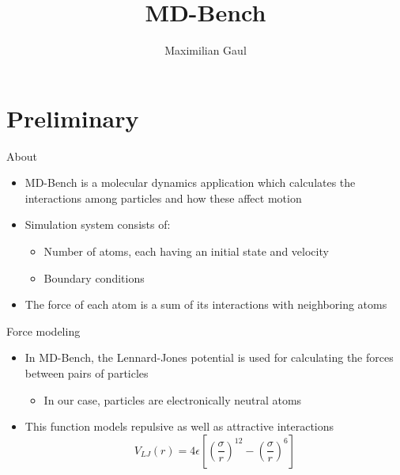 \documentclass[12pt,xcolor={rgb},t]{beamer}
\begin{document}
\title{MD-Bench}
\author{Maximilian Gaul}

\begin{frame}[plain]
\titlepage
\end{frame}

\section{Preliminary}


\begin{frame}{About}

    \begin{itemize}
        \item MD-Bench is a molecular dynamics application which calculates the interactions among particles and how these affect motion
        \item Simulation system consists of:
        \begin{itemize}
            \item Number of atoms, each having an initial state and velocity
            \item Boundary conditions
        \end{itemize}
        \item The force of each atom is a sum of its interactions with neighboring atoms
    \end{itemize}

\end{frame}

\begin{frame}[fragile]{Force modeling}

    \begin{itemize}
        \item In MD-Bench, the Lennard-Jones potential is used for calculating the forces between pairs of particles \cite{MACHADO2021101425}
        \begin{itemize}
            \item In our case, particles are electronically neutral atoms
        \end{itemize}
        \item This function models repulsive as well as attractive interactions
        $$V_{LJ}(r) = 4\epsilon \left[\left( \frac{\sigma}{r} \right)^{12} - \left( \frac{\sigma}{r} \right)^6 \right]$$
    \end{itemize}

\end{frame}
\end{document}
